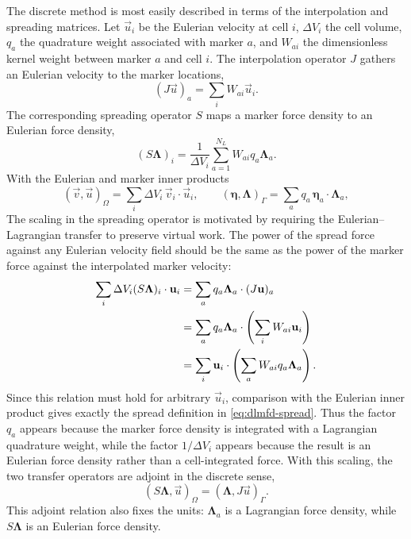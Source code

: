 The discrete method is most easily described in terms of the interpolation and
spreading matrices. Let \(\vec u_i\) be the Eulerian velocity at cell \(i\),
\(\Delta V_i\) the cell volume, \(q_a\) the quadrature weight associated with
marker \(a\), and \(W_{ai}\) the dimensionless kernel weight between marker
\(a\) and cell \(i\). The interpolation operator \(J\) gathers an Eulerian
velocity to the marker locations,
\begin{equation}
    (J\vec u)_a = \sum_i W_{ai}\vec u_i .
    \label{eq:dlmfd-gather}
\end{equation}
The corresponding spreading operator \(S\) maps a marker force density to an
Eulerian force density,
\begin{equation}
    (S\bm\Lambda)_i
    = \frac{1}{\Delta V_i}
    \sum_{a=1}^{N_L} W_{ai} q_a \bm\Lambda_a .
    \label{eq:dlmfd-spread}
\end{equation}
With the Eulerian and marker inner products
\begin{equation}
    (\vec v,\vec u)_\Omega
    = \sum_i \Delta V_i\,\vec v_i\cdot\vec u_i,
    \qquad
    (\bm \eta,\bm\Lambda)_\Gamma
    = \sum_a q_a\,\bm \eta_a\cdot\bm\Lambda_a,
    \label{eq:dlmfd-inner-products}
\end{equation}
The scaling in the spreading operator is motivated by requiring the
Eulerian--Lagrangian transfer to preserve virtual work. The power of the
spread force against any Eulerian velocity field should be the same as the
power of the marker force against the interpolated marker velocity:
\begin{align}
    \sum_i \Delta V_i (S\bm\Lambda)_i\cdot\mathbf{u}_i
     & = \sum_a q_a\bm\Lambda_a\cdot(J\mathbf{u})_a \notag \\
     & = \sum_a q_a\bm\Lambda_a\cdot
    \left(\sum_i W_{ai}\mathbf{u}_i\right) \notag          \\
     & = \sum_i \mathbf{u}_i\cdot
    \left(\sum_a W_{ai}q_a\bm\Lambda_a\right).
    \label{eq:dlmfd-discrete-virtual-work}
\end{align}
Since this relation must hold for arbitrary \(\vec u_i\), comparison with the
Eulerian inner product gives exactly the spread definition in
\eqref{eq:dlmfd-spread}. Thus the factor \(q_a\) appears because the marker
force density is integrated with a Lagrangian quadrature weight, while the
factor \(1/\Delta V_i\) appears because the result is an Eulerian force
density rather than a cell-integrated force.
With this scaling, the two transfer operators are adjoint in the discrete sense,
\begin{equation}
    (S\bm\Lambda,\vec u)_\Omega
    = (\bm\Lambda,J\vec u)_\Gamma .
    \label{eq:dlmfd-adjoint}
\end{equation}
This adjoint relation also fixes the units: \(\bm\Lambda_a\) is a Lagrangian
force density, while \(S\bm\Lambda\) is an Eulerian force density.

